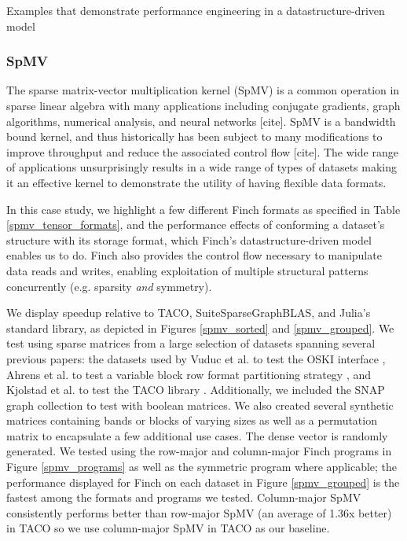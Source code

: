 Examples that demonstrate performance engineering in a datastructure-driven model

\subsubsection{SpMV}
The sparse matrix-vector multiplication kernel (SpMV) is a common operation in sparse linear algebra with many applications including conjugate gradients, graph algorithms, numerical analysis, and neural networks [cite]. SpMV is a bandwidth bound kernel, and thus historically has been subject to many modifications to improve throughput and reduce the associated control flow [cite]. The wide range of applications unsurprisingly results in a wide range of types of datasets making it an effective kernel to demonstrate the utility of having flexible data formats. 

In this case study, we highlight a few different Finch formats as specified in Table \ref{spmv_tensor_formats}, and the performance effects of conforming a dataset’s structure with its storage format, which Finch's datastructure-driven model enables us to do. Finch also provides the control flow necessary to manipulate data reads and writes, enabling exploitation of multiple structural patterns concurrently (e.g. sparsity \textit{and} symmetry). 


We display speedup relative to TACO, SuiteSparseGraphBLAS, and Julia’s standard library, as depicted in Figures \ref{spmv_sorted} and \ref{spmv_grouped}.  We test using sparse matrices from a large selection of datasets spanning several previous papers: the datasets used by Vuduc et al. to test the OSKI interface \cite{vuduc2005oski}, Ahrens et al. to test a variable block row format partitioning strategy \cite{ahrens_optimal_2021}, and Kjolstad et al. to test the TACO library \cite{kjolstad_tensor_2017}. Additionally, we included the SNAP graph collection to test with boolean matrices. We also created several synthetic matrices containing bands or blocks of varying sizes as well as a permutation matrix to encapsulate a few additional use cases. The dense vector is randomly generated. We tested using the row-major and column-major Finch programs in Figure \ref{spmv_programs} as well as the symmetric program where applicable; the performance displayed for Finch on each dataset in Figure \ref{spmv_grouped} is the fastest among the formats and programs we tested. Column-major SpMV consistently performs better than row-major SpMV (an average of 1.36x better) in TACO so we use column-major SpMV in TACO as our baseline.


